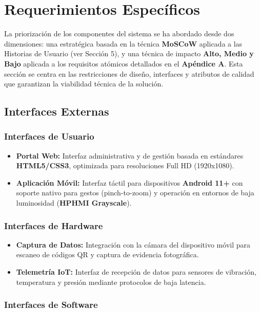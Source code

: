 \section{Requerimientos Específicos}

La priorización de los componentes del sistema se ha abordado desde dos dimensiones: una estratégica basada en la técnica \textbf{MoSCoW} aplicada a las Historias de Usuario (ver Sección 5), y una técnica de impacto \textbf{Alto, Medio y Bajo} aplicada a los requisitos atómicos detallados en el \textbf{Apéndice A}. Esta sección se centra en las restricciones de diseño, interfaces y atributos de calidad que garantizan la viabilidad técnica de la solución.

\subsection{Interfaces Externas}

\subsubsection{Interfaces de Usuario}

\begin{itemize}
    \item \textbf{Portal Web:} Interfaz administrativa y de gestión basada en estándares \textbf{HTML5/CSS3}, optimizada para resoluciones Full HD (1920x1080).
    \item \textbf{Aplicación Móvil:} Interfaz táctil para dispositivos \textbf{Android 11+} con soporte nativo para gestos (pinch-to-zoom) y operación en entornos de baja luminosidad (\textbf{HPHMI Grayscale}).
\end{itemize}
\subsubsection{Interfaces de Hardware}

\begin{itemize}
    \item \textbf{Captura de Datos:} Integración con la cámara del dispositivo móvil para escaneo de códigos QR y captura de evidencia fotográfica.
    \item \textbf{Telemetría IoT:} Interfaz de recepción de datos para sensores de vibración, temperatura y presión mediante protocolos de baja latencia.
\end{itemize}
\subsubsection{Interfaces de Software}

